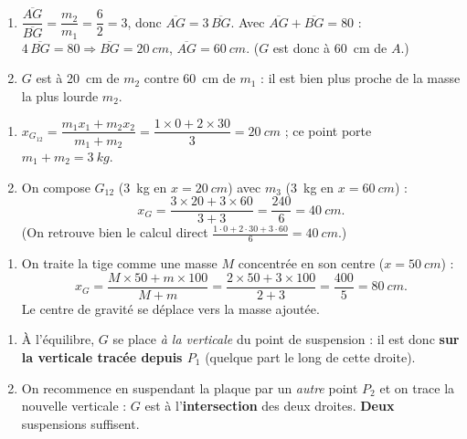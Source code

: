 \documentclass[11pt,a4paper]{article}
\begin{document}
\begin{corrige}
\begin{enumerate}[label=\alph*)]
  \item $\dfrac{\overline{AG}}{\overline{BG}}=\dfrac{m_2}{m_1}=\dfrac{6}{2}=3$, donc
        $\overline{AG}=3\,\overline{BG}$. Avec $\overline{AG}+\overline{BG}=80$ :
        $4\,\overline{BG}=80 \Rightarrow \overline{BG}=\qty{20}{cm}$, $\overline{AG}=\qty{60}{cm}$.
        ($G$ est donc à \qty{60}{cm} de $A$.)
  \item $G$ est à \qty{20}{cm} de $m_2$ contre \qty{60}{cm} de $m_1$ : il est bien plus proche de la
        masse la plus lourde $m_2$.
\end{enumerate}
\end{corrige}

\begin{corrige}
\begin{enumerate}[label=\alph*)]
  \item $x_{G_{12}} = \dfrac{m_1 x_1 + m_2 x_2}{m_1+m_2} = \dfrac{1\times 0 + 2\times 30}{3}
        = \qty{20}{cm}$ ; ce point porte $m_1+m_2=\qty{3}{kg}$.
  \item On compose $G_{12}$ (\qty{3}{kg} en $x=\qty{20}{cm}$) avec $m_3$ (\qty{3}{kg} en
        $x=\qty{60}{cm}$) :
        \[ x_G = \frac{3\times 20 + 3\times 60}{3+3} = \frac{240}{6} = \qty{40}{cm}. \]
        (On retrouve bien le calcul direct $\tfrac{1\cdot 0+2\cdot 30+3\cdot 60}{6}=\qty{40}{cm}$.)
\end{enumerate}
\end{corrige}

\begin{corrige}
\begin{enumerate}[label=\alph*)]
  \item On traite la tige comme une masse $M$ concentrée en son centre ($x=\qty{50}{cm}$) :
        \[ x_G = \frac{M\times 50 + m\times 100}{M+m} = \frac{2\times 50 + 3\times 100}{2+3}
        = \frac{400}{5} = \qty{80}{cm}. \]
        Le centre de gravité se déplace vers la masse ajoutée.
\end{enumerate}
\end{corrige}

\begin{corrige}
\begin{enumerate}[label=\alph*)]
  \item À l'équilibre, $G$ se place \emph{à la verticale} du point de suspension : il est donc
        \textbf{sur la verticale tracée depuis $P_1$} (quelque part le long de cette droite).
  \item On recommence en suspendant la plaque par un \emph{autre} point $P_2$ et on trace la
        nouvelle verticale : $G$ est à l'\textbf{intersection} des deux droites. \textbf{Deux}
        suspensions suffisent.
\end{enumerate}
\end{corrige}
\end{document}
